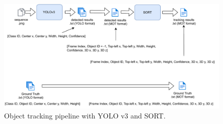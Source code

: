 \begin{figure}[!htbp]
  \centering
  \includegraphics[width=1.0\linewidth]{img/YOLOv3+SORT.pdf}
  \caption[Object tracking pipeline with YOLO v3 and SORT]
  {Object tracking pipeline with YOLO v3 and SORT.}
  \label{fig:yolov3+SORT}
\end{figure}